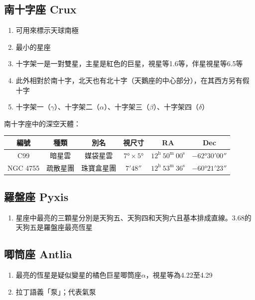 \subsection{南十字座 Crux}
\begin{enumerate}
    \item 可用來標示天球南極
    \item 最小的星座
    \item 十字架一是一對雙星，主星是紅色的巨星，視星等1.6等，伴星視星等6.5等
    \item 此外相對於南十字，北天也有北十字（天鵝座的中心部分），在其西方另有假十字
    \item 十字架一（\(\gamma\)）、十字架二（\(\alpha\)）、十字架三（\(\beta\)）、十字架四（\(\delta\)）
\end{enumerate}
南十字座中的深空天體：

\begin{center}
\begin{longtable}{c | c | c | c | c | c}
    編號 & 種類 & 別名 & 視尺寸 & RA & Dec \\
    \hline
    \endfirsthead


    \endfoot

    \endlastfoot

    C99 & 暗星雲 & 媒袋星雲 & \(\ang{7;;}\times\ang{5;;}\) & \(12^\text{h }50^\text{m }00^\text{s}\) & \(-\ang{62;30;00}\) \\
    NGC 4755 & 疏散星團 & 珠寶盒星團 & \(\ang{;7;48}\) & \(12^\text{h }53^\text{m }36^\text{s}\) & \(-\ang{60;21;23}\)
\end{longtable}
\end{center}

\subsection{羅盤座 Pyxis}
\begin{enumerate}
    \item 星座中最亮的三顆星分別是天狗五、天狗四和天狗六且基本排成直線。3.68的天狗五是羅盤座最亮恆星
\end{enumerate}

\subsection{唧筒座 Antlia}
\begin{enumerate}
    \item 最亮的恆星是疑似變星的橘色巨星唧筒座\(\alpha\)，視星等為4.22至4.29
    \item 拉丁語義「泵」；代表氣泵
\end{enumerate}

